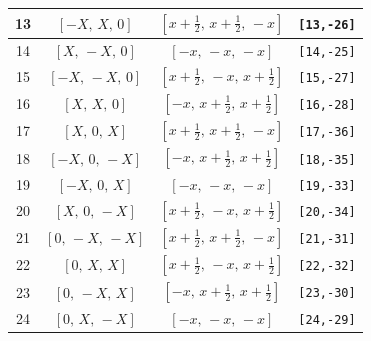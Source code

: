 \documentclass[fleqn,8pt]{jsarticle}
\begin{document}
\begin{longtable}{cccc}
13 & $\left[ - X,\, X,\, 0 \right]$ & $\left[ x + \frac{1}{2},\, x + \frac{1}{2},\, - x \right]$ & {\tt [13,-26]} \\ \hline
14 & $\left[ X,\, - X,\, 0 \right]$ & $\left[ - x,\, - x,\, - x \right]$ & {\tt [14,-25]} \\ \hline
15 & $\left[ - X,\, - X,\, 0 \right]$ & $\left[ x + \frac{1}{2},\, - x,\, x + \frac{1}{2} \right]$ & {\tt [15,-27]} \\ \hline
16 & $\left[ X,\, X,\, 0 \right]$ & $\left[ - x,\, x + \frac{1}{2},\, x + \frac{1}{2} \right]$ & {\tt [16,-28]} \\ \hline
17 & $\left[ X,\, 0,\, X \right]$ & $\left[ x + \frac{1}{2},\, x + \frac{1}{2},\, - x \right]$ & {\tt [17,-36]} \\ \hline
18 & $\left[ - X,\, 0,\, - X \right]$ & $\left[ - x,\, x + \frac{1}{2},\, x + \frac{1}{2} \right]$ & {\tt [18,-35]} \\ \hline
19 & $\left[ - X,\, 0,\, X \right]$ & $\left[ - x,\, - x,\, - x \right]$ & {\tt [19,-33]} \\ \hline
20 & $\left[ X,\, 0,\, - X \right]$ & $\left[ x + \frac{1}{2},\, - x,\, x + \frac{1}{2} \right]$ & {\tt [20,-34]} \\ \hline
21 & $\left[ 0,\, - X,\, - X \right]$ & $\left[ x + \frac{1}{2},\, x + \frac{1}{2},\, - x \right]$ & {\tt [21,-31]} \\ \hline
22 & $\left[ 0,\, X,\, X \right]$ & $\left[ x + \frac{1}{2},\, - x,\, x + \frac{1}{2} \right]$ & {\tt [22,-32]} \\ \hline
23 & $\left[ 0,\, - X,\, X \right]$ & $\left[ - x,\, x + \frac{1}{2},\, x + \frac{1}{2} \right]$ & {\tt [23,-30]} \\ \hline
24 & $\left[ 0,\, X,\, - X \right]$ & $\left[ - x,\, - x,\, - x \right]$ & {\tt [24,-29]} \\
\end{longtable}
\renewcommand{\arraystretch}{1.2}
\end{document}
